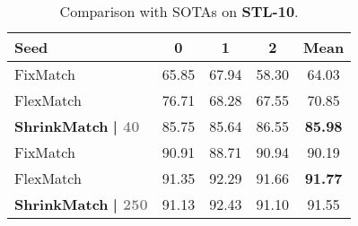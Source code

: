 \documentclass[10pt,twocolumn,letterpaper]{article}
\begin{document}
\begin{table}[t]
\centering
\small
\setlength\tabcolsep{2.9mm}
    \centering
    \begin{tabular}{l|ccc|c}
    \toprule
    
    Seed & 0 & 1 & 2 & Mean \\
    
    \midrule
    
    FixMatch \cite{fixmatch} & 65.85 & 67.94 & 58.30 & 64.03 \\
    
    FlexMatch \cite{flexmatch} & 76.71 & 68.28 & 67.55 & 70.85 \\
    
    \textbf{ShrinkMatch} \textbf{| \textcolor{gray}{\footnotesize{40}}} & 85.75 & 85.64 & 86.55 & \textbf{85.98} \\
    
    \midrule
    
    FixMatch \cite{fixmatch} & 90.91 & 88.71 & 90.94 & 90.19 \\
    
    FlexMatch \cite{flexmatch} & 91.35 & 92.29 & 91.66 & \textbf{91.77} \\
    
    \textbf{ShrinkMatch} \textbf{| \textcolor{gray}{\footnotesize{250}}} & 91.13 & 92.43 & 91.10 & 91.55 \\
    
    \bottomrule

    \end{tabular}
    \vspace{-1mm}
    \caption{Comparison with SOTAs on \textbf{STL-10}.}
    \vspace{-2mm}
    \label{tab:stl10}
\end{table} 
\end{document}
